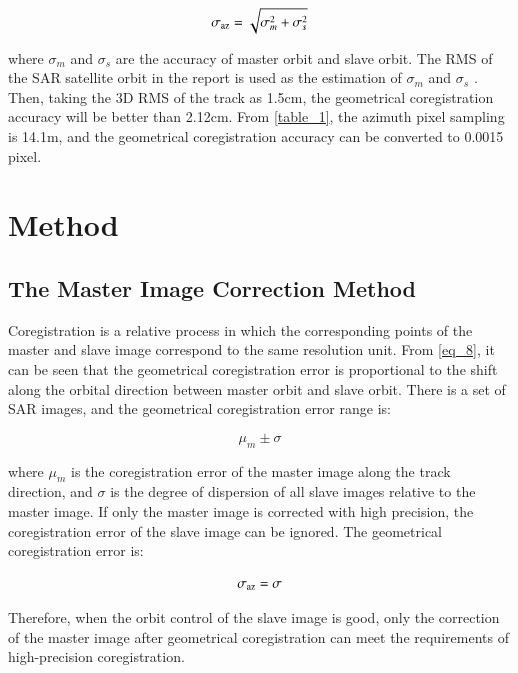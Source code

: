 \documentclass[preprint, authoryear]{elsarticle}
\begin{document}
\begin{equation}
    \sigma_{\rm az} = \sqrt{\sigma_m^2 + \sigma_s^2}
    \label{eq_9}
\end{equation}

\noindent where $\sigma_m$ and $\sigma_s$ are the accuracy of master orbit and slave orbit. The RMS of the SAR satellite orbit in the report is used as the estimation of $\sigma_m$ and $\sigma_s$ \cite{InSAR_uncertainty_due_to_orbital_errors}. Then, taking the 3D RMS of the track as 1.5cm, the geometrical coregistration accuracy will be better than 2.12cm. From \ref{table_1}, the azimuth pixel sampling is 14.1m, and the geometrical coregistration accuracy can be converted to 0.0015 pixel. \par


\section{Method}

\subsection{The Master Image Correction Method}

Coregistration is a relative process in which the corresponding points of the master and slave image correspond to the same resolution unit. From \ref{eq_8}, it can be seen that the geometrical coregistration error is proportional to the shift along the orbital direction between master orbit and slave orbit. There is a set of SAR images, and the geometrical coregistration error range is: \par

\begin{equation}
    \mu_m \pm \sigma
    \label{eq_10}
\end{equation}

\noindent where $\mu_m$ is the coregistration error of the master image along the track direction, and $\sigma$ is the degree of dispersion of all slave images relative to the master image. If only the master image is corrected with high precision, the coregistration error of the slave image can be ignored. The geometrical coregistration error is: \par

\begin{equation}
    \sigma_{\rm az} = \sigma
    \label{eq_11}
\end{equation}

\noindent Therefore, when the orbit control of the slave image is good, only the correction of the master image after geometrical coregistration can meet the requirements of high-precision coregistration. \par
\end{document}
